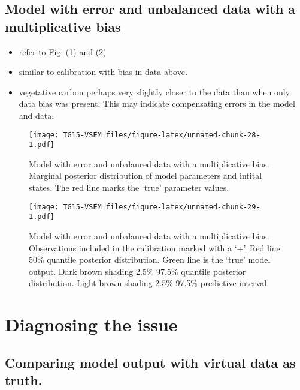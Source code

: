 \documentclass[]{article}
\providecommand{\tightlist}{%
  \setlength{\itemsep}{0pt}\setlength{\parskip}{0pt}}
\begin{document}
\subsection{Model with error and unbalanced data with a multiplicative
bias}\label{model-with-error-and-unbalanced-data-with-a-multiplicative-bias}

\begin{itemize}
\tightlist
\item
  refer to Fig. (\ref{fig:errModunbalDataBiasPar}) and
  (\ref{fig:errModunbalDataBiasOut})
\item
  similar to calibration with bias in data above.
\item
  vegetative carbon perhaps very slightly closer to the data than when
  only data bias was present. This may indicate compensating errors in
  the model and data.
\end{itemize}

\begin{figure}
\centering
\texttt{[image: TG15-VSEM\_files/figure-latex/unnamed-chunk-28-1.pdf]}
\caption{\label{fig:errModunbalDataBiasPar}Model with error and
unbalanced data with a multiplicative bias. Marginal posterior
distribution of model parameters and intital states. The red line marks
the `true' parameter values.}
\end{figure}

\begin{figure}
\centering
\texttt{[image: TG15-VSEM\_files/figure-latex/unnamed-chunk-29-1.pdf]}
\caption{\label{fig:errModunbalDataBiasOut}Model with error and
unbalanced data with a multiplicative bias. Observations included in the
calibration marked with a `+'. Red line 50\% quantile posterior
distribution. Green line is the `true' model output. Dark brown shading
2.5\% 97.5\% quantile posterior distribution. Light brown shading 2.5\%
97.5\% predictive interval.}
\end{figure}

\section{Diagnosing the issue}\label{diagnosing-the-issue}

\subsection{Comparing model output with virtual data as
truth.}\label{comparing-model-output-with-virtual-data-as-truth.}
\end{document}
